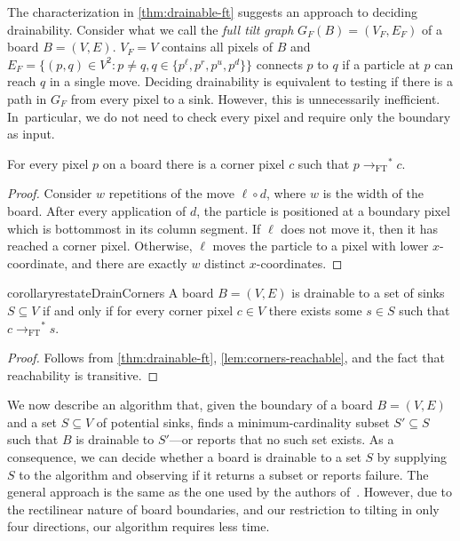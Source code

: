 \documentclass[a4paper,UKenglish,cleveref,thm-restate]{lipics-v2021}
\newcommand{\FT}{\ensuremath{\mathrm{FT}}\xspace}
\newcommand{\rOne}[1][M]{\ensuremath{\rightarrow_{#1}}}
\newcommand{\rStar}[1][M]{\rOne[#1]^*}
\begin{document}
The characterization in \cref{thm:drainable-ft} suggests an approach to
deciding drainability. Consider what we call the \emph{full tilt graph}
$G_F(B)=(V_F, E_F)$ of a board $B=(V,E)$. $V_F=V$ contains all pixels of $B$ and
\(E_F=\{(p,q) \in V^2 : p \neq q, q \in \{p^{\ell}, p^r, p^u, p^d\}\}\) connects
$p$ to $q$ if a particle at $p$ can reach $q$ in a single move. Deciding
drainability is equivalent to testing if there is a path in $G_F$ from every pixel to a sink.
However, this is unnecessarily inefficient. In~particular, we do not need to check every pixel
and require only the boundary as input.

\begin{lemma}
    \label{lem:corners-reachable}
    For every pixel $p$ on a board there is a corner pixel $c$ such that \(p
    \rStar[\FT] c\).
\end{lemma}
\begin{proof}
    Consider $w$ repetitions of the move $\ell \circ d$, where $w$ is the width
    of the board. After every application of $d$, the
    particle is positioned at a boundary pixel which is bottommost in its column
    segment. If $\ell$ does not move it, then it has reached a corner
    pixel. Otherwise, $\ell$ moves the particle to a pixel with lower
    $x$-coordinate, and there are exactly $w$ distinct $x$-coordinates.
\end{proof}

\begin{restatable}{corollary}{restateDrainCorners}
    \label{cor:drainable-ft-corners}
    A board $B=(V,E)$ is drainable to a set of sinks $S \subseteq V$ if and only if
    for every corner pixel $c \in V$ there exists some $s \in S$ such that $c \rStar[\FT] s$.
\end{restatable}
\begin{proof}
    Follows from \cref{thm:drainable-ft}, \cref{lem:corners-reachable}, and the fact that reachability
    is transitive.
\end{proof}

We now describe an algorithm that, given the boundary of a board $B=(V,E)$ and
a set $S \subseteq V$ of potential sinks, finds a minimum-cardinality subset
$S' \subseteq S$ such that $B$ is drainable to $S'$---or reports that no such
set exists. As a consequence, we can decide whether a board is drainable to a
set $S$ by supplying $S$ to the algorithm and observing if it returns a subset
or reports failure. The general approach is the same as the one used by the
authors of~\cite{acchlo-draining2014}. However, due to the rectilinear nature of
board boundaries, and our restriction to tilting in only four directions, our
algorithm requires less time.
\end{document}

